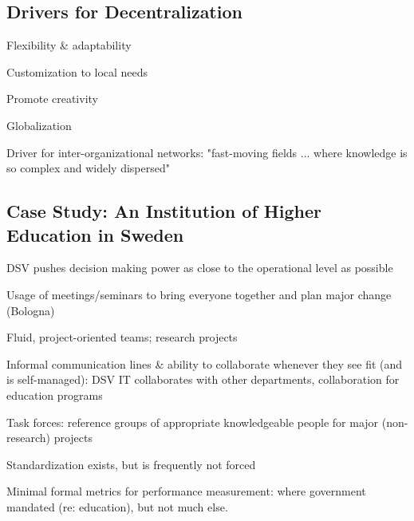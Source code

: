 \subsection{Drivers for Decentralization}

Flexibility \& adaptability

Customization to local needs

Promote creativity

Globalization

Driver for inter-organizational networks: "fast-moving fields ... where knowledge is so complex and widely dispersed"~\cite{Bolman2008}

\subsection{Case Study: An Institution of Higher Education in Sweden}

DSV pushes decision making power as close to the operational level as possible

Usage of meetings/seminars to bring everyone together and plan major change (Bologna)

Fluid, project-oriented teams; research projects

Informal communication lines \& ability to collaborate whenever they see fit (and is self-managed): DSV IT collaborates with other departments, collaboration for education programs

Task forces: reference groups of appropriate knowledgeable people for major (non-research) projects

Standardization exists, but is frequently not forced

Minimal formal metrics for performance measurement: where government mandated (re: education), but not much else.  